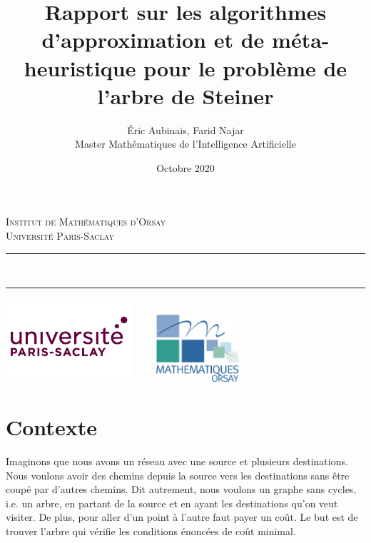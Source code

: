 \documentclass[11pt,french]{report}
\newcommand{\HRule}{\rule{\linewidth}{0.5mm}}
\begin{document}
	\title{Rapport sur les algorithmes d'approximation et de méta-heuristique pour le problème de l'arbre de Steiner\\}
	\author{
		Éric Aubinais, Farid Najar\\[0.2cm]
		Master Mathématiques de l'Intelligence Artificielle }
	\date{Octobre 2020}
	\makeatletter
	\begin{titlepage}
		\centering
		\textsc{\LARGE Institut de Mathématiques d'Orsay \\ Université Paris-Saclay}\\[4cm]
		\HRule \\
		{ \huge \bfseries \@title[2cm] }
		\begin{Large}
			\@author
		\end{Large}
		\HRule
		\vfill
		\includegraphics[width=0.35\textwidth]{paris-saclay.png}
		\hfill
		\includegraphics[width=0.35\textwidth, height=2.5cm]{imo.png}
		\pagebreak
		\tableofcontents
		\pagebreak
	\end{titlepage}

	\section{Contexte\label{Contexte}}
	Imaginons que nous avons un réseau avec une source et plusieurs destinations. Nous voulons avoir des chemins depuis la source vers les destinations sans être coupé par d'autres chemins. Dit autrement, nous voulons un graphe sans cycles, i.e. un arbre, en partant de la source et en ayant les destinations qu'on veut visiter. De plus, pour aller d'un point à l'autre faut payer un coût. Le but est de trouver l'arbre qui vérifie les conditions énoncées de coût minimal.
\end{document}
